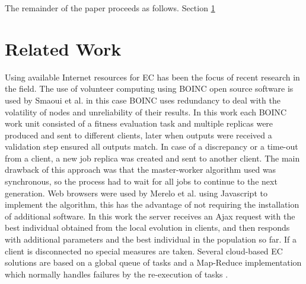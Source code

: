 \documentclass{sig-alternate}
\begin{document}
The remainder of the paper proceeds as follows. Section \ref{sec:work} 

\section{Related Work}
\label{sec:work}
Using available Internet resources for EC has been the focus of recent research
in the field. The use of volunteer computing using BOINC open source software 
is used by Smaoui et al.  \cite{FekiNG09} in this case BOINC uses redundancy
to deal with the volatility of nodes and unreliability of their results. 
In this work each BOINC work unit consisted of a fitness evaluation task and
multiple replicas were produced and sent to different clients, later when 
outputs were received a validation step ensured all outputs match. In case of
a discrepancy or a time-out from a client, a new job replica was created and
sent to another client. The main drawback of this approach was that the 
master-worker algorithm used was synchronous, so the process had to wait 
for all jobs to continue to the next generation. Web browsers were used by 
Merelo et al. \cite{JSON} using Javascript to implement the algorithm, this has the advantage of not requiring the installation of additional software. 
In this work the server receives an Ajax request with the best individual 
obtained from the local evolution in clients, and then responds with 
additional parameters and the best individual in the population so far. 
If a client is disconnected no special measures are taken. Several cloud-based
EC solutions are based on a  global queue of tasks and a Map-Reduce 
implementation which normally handles failures by the re-execution of 
tasks \cite{fazenda2012,di2013towards,FlexGP}. 

\end{document}
